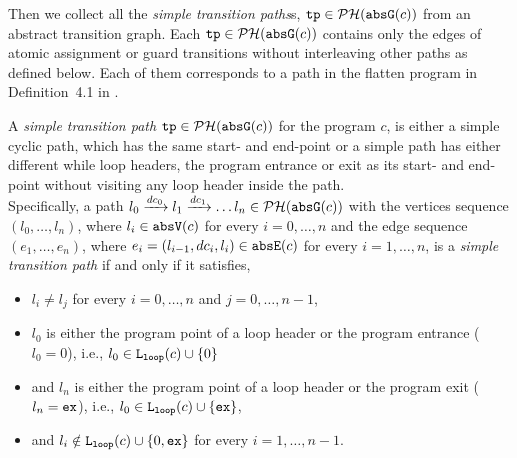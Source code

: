 Then we collect all the \emph{simple transition paths}s, $\mathtt{tp} \in \mathcal{PH}(\mathtt{abs}{\mathtt{G}}(c))$ from an abstract transition graph.
Each $\mathtt{tp} \in \mathcal{PH}(\mathtt{abs}{\mathtt{G}}(c))$ 
contains only the edges of atomic assignment or guard transitions without interleaving other paths as defined below.
Each of them corresponds to a path in the flatten program in Definition~4.1 in \cite{GulwaniJK09}.
\begin{defn}
  \label{def:tpath}
A \emph{simple transition path}
$\mathtt{tp} \in \mathcal{PH}(\mathtt{abs}{\mathtt{G}}(c))$ for the program $c$, is either a simple cyclic path, which has the same start- and end-point
or a simple path has either different while loop headers, the program entrance or exit as its start- and end-point
without visiting any loop header inside the path.
\\
Specifically, a path $l_0 \xrightarrow{dc_0} l_1 \xrightarrow{dc_1} \ldots l_n \in \mathcal{PH}(\mathtt{abs}{\mathtt{G}}(c))$ with the
vertices sequence $(l_0, \ldots, l_n)$, where $l_i \in \mathtt{abs}{\mathtt{V}}(c)$ for every $i = 0, \ldots, n$ and
%
the edge sequence $(e_1, \ldots, e_n)$, where $e_i = (l_{i - 1}, dc_i, l_{i}) \in \mathtt{abs}{\mathtt{E}}(c)$ for every $i = 1, \ldots, n$,
%
is a \emph{simple transition path} if and only if it satisfies,
\begin{itemize}
  \item $l_i \neq l_j$ for every $i = 0, \ldots, n$ and $j = 0, \ldots, {n - 1}$,
  \item $l_0$ is either the program point of a loop header or the program entrance ($l_0 = 0$),
  i.e., $l_0 \in \mathtt{L}_{\mathtt{loop}}(c) \cup \{ 0 \}$
  \item and $l_n$ is either the program point of a loop header or the program exit ($l_n = \mathtt{ex}$),
  i.e., $l_0 \in \mathtt{L}_{\mathtt{loop}}(c) \cup \{ \mathtt{ex} \}$,
  \item and $l_i \notin \mathtt{L}_{\mathtt{loop}}(c) \cup \{ 0, \mathtt{ex} \}$ for every $i = 1, \ldots, n-1$.
\end{itemize}
\end{defn}
